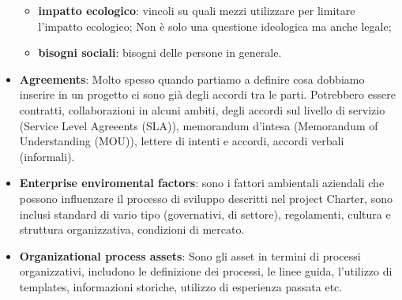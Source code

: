 \begin{itemize}
\begin{itemize}
		\item \textbf{impatto ecologico}: vincoli su quali mezzi utilizzare per limitare l'impatto ecologico; Non è solo una questione ideologica ma anche legale;
		\item \textbf{bisogni sociali}: bisogni delle persone in generale.
	\end{itemize}
	\item \textbf{Agreements}: Molto spesso quando partiamo a definire cosa dobbiamo inserire in un progetto ci sono già degli accordi tra le parti. Potrebbero essere contratti, collaborazioni in alcuni ambiti, degli accordi sul livello di servizio (Service Level Agreeents (SLA)), memorandum d'intesa (Memorandum of Understanding (MOU)), lettere di intenti e accordi, accordi verbali (informali).
	\item \textbf{Enterprise enviromental factors}: sono i fattori ambientali aziendali che possono influenzare il processo di sviluppo descritti nel project Charter, sono inclusi standard di vario tipo (governativi, di settore), regolamenti, cultura e struttura organizzativa, condizioni di mercato.
	\item \textbf{Organizational process assets}: Sono gli asset in termini di processi organizzativi, includono le definizione dei processi, le linee guida, l'utilizzo di templates, informazioni storiche, utilizzo di esperienza passata etc.
\end{itemize}
